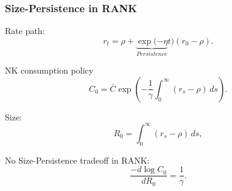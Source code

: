 \documentclass[10pt,aspectratio=169]{beamer}
\begin{document}
\begin{frame}\frametitle{Size-Persistence  in RANK}
    Rate path:
        \begin{equation*}
            r_t=\rho+\underbrace{\exp(-\eta}_{\textit{Persistence}} t)(r_0-\rho).\label{eq:InterestRatePath}
        \end{equation*}
    
    NK consumption policy    
    \[C_0=\bar C\exp\left(-\frac{1}{\gamma}\int_0^\infty \left(r_s-\rho\right)\,ds\right).\]
    
    Size:
    \begin{equation*}
        R_0=\int_0^\infty \left(r_s-\rho\right)\,ds,\label{eq:KMVsize}
    \end{equation*}

    
    No Size-Persistence tradeoff in RANK:
    \[\frac{-d \log C_0}{dR_0}=\frac{1}{\gamma}.\]
    
    
    \end{frame}
    
    


    
        
\end{document}
